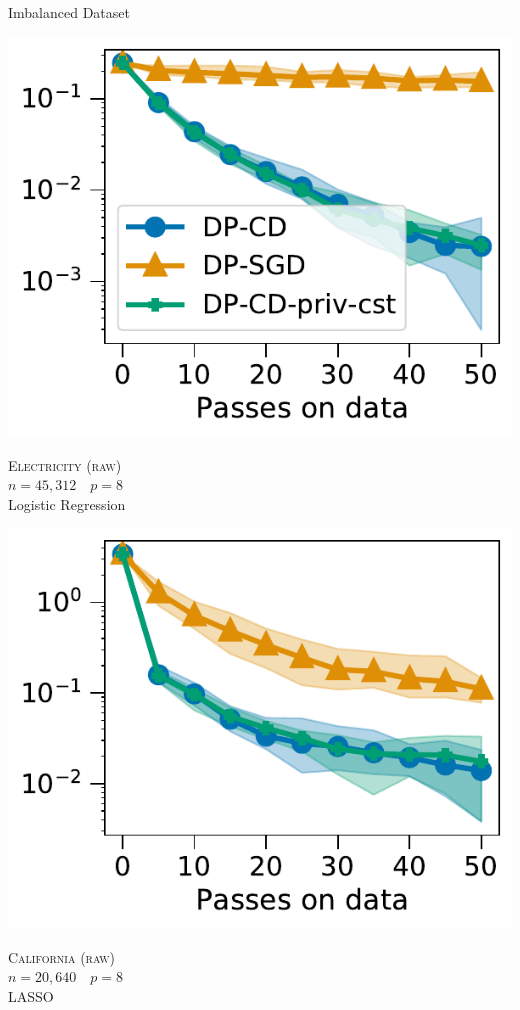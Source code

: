 \documentclass{beamer}
\begin{document}
\begin{frame}
  \begin{center}
    \Huge Imbalanced Dataset
  \end{center}

  \pause

  \vspace{1em}
  \begin{minipage}{0.5\linewidth}
    \includegraphics[width=\linewidth]{images/optimization_electricity_raw.pdf}%
    \begin{center}
      \normalsize
      \textsc{Electricity (raw)} \\
      $n=45,312$~~$p=8$ \\
      Logistic Regression
    \end{center}
  \end{minipage}%
  \begin{minipage}{0.5\linewidth}
    \includegraphics[width=\linewidth]{images/optimization_california_raw.pdf}%
    \begin{center}
      \normalsize
      \textsc{California (raw)} \\
      $n=20,640$~~$p=8$ \\
      LASSO
    \end{center}
  \end{minipage}


\end{frame}
\end{document}
